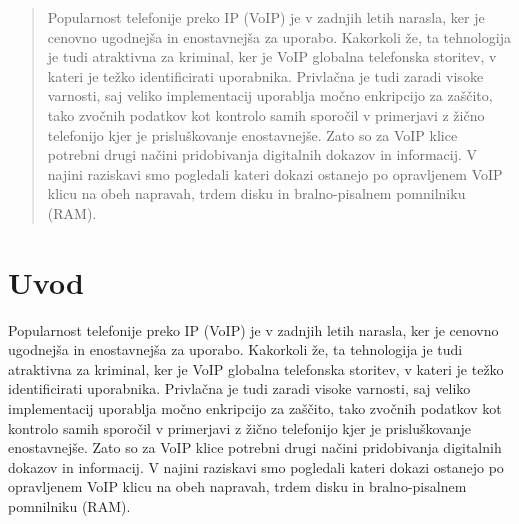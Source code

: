 \documentclass{acm_proc_article-sp}
\begin{document}
\date{30 July 1999}

\maketitle
\begin{abstract}
Popularnost telefonije preko IP (VoIP) je v zadnjih letih narasla, ker je cenovno ugodnejša in enostavnejša za uporabo. Kakorkoli že, ta tehnologija je tudi atraktivna za kriminal, ker je VoIP globalna telefonska storitev, v kateri je težko identificirati uporabnika. Privlačna je tudi zaradi visoke varnosti, saj veliko implementacij uporablja močno enkripcijo za zaščito, tako zvočnih podatkov kot kontrolo samih sporočil v primerjavi z žično telefonijo kjer je prisluškovanje enostavnejše. Zato so za VoIP klice potrebni drugi načini pridobivanja digitalnih dokazov in informacij. V najini raziskavi smo pogledali kateri dokazi ostanejo po opravljenem VoIP klicu na obeh napravah, trdem disku in bralno-pisalnem pomnilniku (RAM).

\end{abstract}



\section{Uvod}
Popularnost telefonije preko IP (VoIP) je v zadnjih letih narasla, ker je cenovno ugodnejša in enostavnejša za uporabo. Kakorkoli že, ta tehnologija je tudi atraktivna za kriminal, ker je VoIP globalna telefonska storitev, v kateri je težko identificirati uporabnika. Privlačna je tudi zaradi visoke varnosti, saj veliko implementacij uporablja močno enkripcijo za zaščito, tako zvočnih podatkov kot kontrolo samih sporočil v primerjavi z žično telefonijo kjer je prisluškovanje enostavnejše. Zato so za VoIP klice potrebni drugi načini pridobivanja digitalnih dokazov in informacij. V najini raziskavi smo pogledali kateri dokazi ostanejo po opravljenem VoIP klicu na obeh napravah, trdem disku in bralno-pisalnem pomnilniku (RAM).
\end{document}
